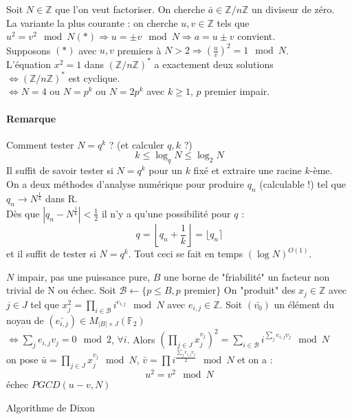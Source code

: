 \documentclass[12pt,a4paper]{report}
\begin{document}
Soit $N \in \mathbb{Z}$ que l'on veut factoriser. On cherche $\bar{a} \in \mathbb{Z}/n\mathbb{Z}$ un diviseur de zéro.\\
La variante la plus courante : on cherche $u, v \in \mathbb{Z}$ tels que $u^2 = v^2 \mod N (*) \Rightarrow u = \pm v \mod N \Rightarrow a = u \pm v $ convient.\\
Supposons $(*)$ avec $u,v$ premiers à $N>2 \Rightarrow \left(\frac{u}{v}\right)^2 = 1 \mod N$.\\
L'équation $x^2 = 1$ dans $(\mathbb{Z}/n\mathbb{Z})^*$ a exactement deux solutions \\
$\Longleftrightarrow  (\mathbb{Z}/n\mathbb{Z})^*$ est cyclique.\\
$ \Longleftrightarrow N=4 $ ou $N = p^k $ ou $ N= 2p^k$ avec $k \geqslant 1$, $p$ premier impair.
\paragraph{Remarque\\}
Comment tester $N=q^k $ ? (et calculer $q,k$ ?)
$$ k \leqslant \log_q N \leqslant \log_2 N $$
Il suffit de savoir tester si $N = q^k $ pour un $k$ fixé et extraire une racine $k$-ème.\\
On a deux méthodes d'analyse numérique pour produire $q_n$ (calculable !) tel que $q_n \longrightarrow N^{\frac{1}{k}}$ dans R.\\
Dès que $|q_n -  N^{\frac{1}{k}}| < \frac{1}{2}$ il n'y a qu'une possibilité pour $q$ : 
$$ q = \left\lfloor q_n + \frac{1}{k} \right\rfloor = \lfloor q_n \rceil$$
et il suffit de tester si $N = q^k$. Tout ceci se fait en temps $(\log N)^{O(1)}$.
\begin{algorithm}[h!]
\begin{algorithmic}[1]
\REQUIRE $N$ impair, pas une puissance pure, $B$ une borne de "friabilité"
\ENSURE un facteur non trivial de N ou échec. 
\STATE Soit $\mathcal{B} \leftarrow \{p \leqslant B, p \mbox{ premier}\}$
\STATE On "produit" des $x_j \in \mathbb{Z}$ avec $j \in J$ tel que $x_j^2 = \prod\limits_{i \in \mathcal{B}} i^{e_{i,j}} \mod N$ avec $e_{i,j} \in \mathbb{Z} $.
\STATE Soit $(\bar{v_0})$ un élément du noyau de $(\bar{e_{i,j}}) \in M_{|B|\times J} (\mathbb{F}_2) $\\
$\Leftrightarrow \sum\limits_j e_{i,j} v_j = 0 \mod 2$, $\forall i$.
\STATE Alors $\left(\prod\limits_{j \in J} x_j^{v_j} \right)^2 = \sum\limits_{i \in \mathcal{B}} i^{\sum\limits_j e_{i,j}v_j} \mod N$\\
on pose $\bar{u} = \prod\limits_{j\in J} x_j ^{v_j} \mod N$, $\bar{v} = \prod i^{\frac{\sum\limits_j e_{i,j}v_j}{2}} \mod N$ et on a :
$$ u^2 = v^2 \mod N $$
\RETURN échec
\ELSE \RETURN $PGCD(u-v,N)$
\ENDIF
\end{algorithmic}
\caption{Algorithme de Dixon}
\end{algorithm}
\end{document}
